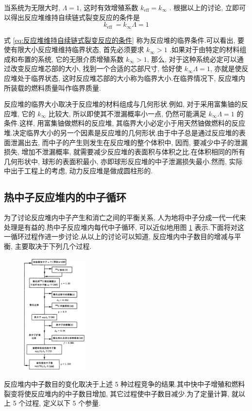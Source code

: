 \documentclass{Sichuan Normal University}
\begin{document}
当系统为无限大时, $\Lambda=1$, 这时有效增殖系数 $k_{\mathrm{eff}}=k_{\infty}$ .
根据以上的讨论, 立即可以得出反应堆维持自续链式裂变反应的条件是
\begin{equation}
    k_{\text {eff }}=k_{\infty} \Lambda=1
    \label{eq:反应堆维持自续链式裂变反应的条件}
\end{equation}

式 \eqref{eq:反应堆维持自续链式裂变反应的条件} 称为反应堆的临界条件.可以看出, 要使有限大小反应堆维持临界状态, 首先必须要求 $k_{\infty}>1$ .如果对于由特定的材料组成和布置的系统, 它的无限介质增殖系数 $k_{\infty}>1$, 那么, 对于这种系统必定可以通过改变反应堆芯部的大小, 找到一个合适的芯部尺寸, 恰好使 $k_{\infty} \Lambda=1$, 亦就是使反应堆处于临界状态, 这时反应堆芯部的大小称为临界大小.在临界情况下, 反应堆内所装载的燃料质量叫作临界质量.

反应堆的临界大小取决于反应堆的材料组成与几何形状.例如, 对于采用富集铀的反应堆, 它的 $k_{\infty}$ 比较大, 所以即使其不泄漏概率小一点, 仍然可能满足 $k_{\infty} \Lambda=1$ 的条件.这样, 用富集铀做燃料的反应堆, 其临界大小必定小于用天然铀做燃料的反应堆.决定临界大小的另一个因素是反应堆的几何形状.由于中子总是通过反应堆的表面泄漏出去, 而中子的产生则发生在反应堆的整个体积中, 因而, 要减少中子的泄漏损失, 增加不泄漏概率, 就需要减少反应堆的表面积与体积之比.在体积相同的所有几何形状中, 球形的表面积最小, 亦即球形反应堆的中子泄漏损失最小.然而, 实际中出于工程上的考虑, 动力反应堆是做成圆柱形的.
\subsection{热中子反应堆内的中子循环}
为了讨论反应堆内中子产生和消亡之间的平衡关系, 人为地将中子分成一代一代来处理是有益的.热中子反应堆内每代中子循环, 可以近似地用图 \ref{fig:热中子反应堆内的中子平衡} 表示.下面将对这一循环过程作进一步讨论.从以上的讨论可以知道, 反应堆内中子数目的增减与平衡, 主要取决于下列几个过程.

\begin{figure}
    \centering
    \includegraphics[width=0.3\textwidth]{./figure/热中子反应堆内的中子平衡.png} %
    \vspace{3mm}
    \label{fig:热中子反应堆内的中子平衡}
  \end{figure}
反应堆内中子数目的变化取决于上述 5 种过程竞争的结果.其中快中子增殖和燃料裂变将使反应堆内的中子数目增加, 其它过程使中子数目减少.为了定量计算, 就以上 5 个过程, 定义以下 5 个参量.
\end{document}
